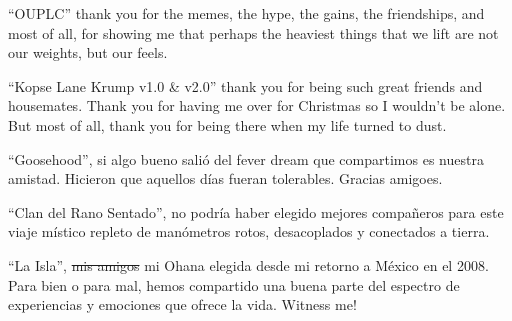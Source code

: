 \begin{frontmatter}[Acknowledgements]
\begin{justify}
        ``OUPLC'' thank you for the memes, the hype, the gains, the friendships, and most of all, for showing me that perhaps the heaviest things that we lift are not our weights, but our feels.

        ``Kopse Lane Krump v1.0 \& v2.0'' thank you for being such great friends and housemates. Thank you for having me over for Christmas so I wouldn't be alone. But most of all, thank you for being there when my life turned to dust.

        ``Goosehood'', si algo bueno salió del fever dream que compartimos es nuestra amistad. Hicieron que aquellos días fueran tolerables. Gracias amigoes.

        ``Clan del Rano Sentado'', no podría haber elegido mejores compañeros para este viaje místico repleto de manómetros rotos, desacoplados y conectados a tierra.

        ``La Isla'', \sout{mis amigos} mi Ohana elegida desde mi retorno a México en el 2008. Para bien o para mal, hemos compartido una buena parte del espectro de experiencias y emociones que ofrece la vida. Witness me!
    \end{justify}

\end{frontmatter}
